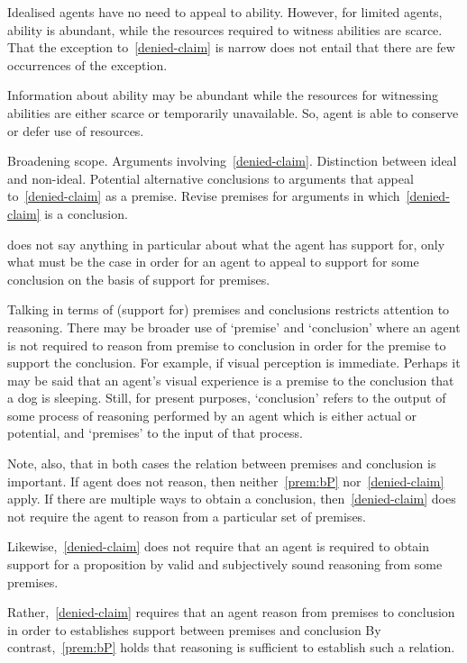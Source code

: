 \documentclass[10pt]{article}
\begin{document}
\begin{note}
  Idealised agents have no need to appeal to ability.
  However, for limited agents, ability is abundant, while the resources required to witness abilities are scarce.
  That the exception to~\ref{denied-claim} is narrow does not entail that there are few occurrences of the exception.

  Information about ability may be abundant while the resources for witnessing abilities are either scarce or temporarily unavailable.
  So, agent is able to conserve or defer use of resources.

  Broadening scope.
  Arguments involving~\ref{denied-claim}.
  Distinction between ideal and non-ideal.
  Potential alternative conclusions to arguments that appeal to~\ref{denied-claim} as a premise.
  Revise premises for arguments in which~\ref{denied-claim} is a conclusion.
\end{note}

\begin{note}[Scope of \mp{}]
  \mp{} does not say anything in particular about what the agent has support for, only what must be the case in order for an agent to appeal to support for some conclusion on the basis of support for premises.

  Talking in terms of (support for) premises and conclusions restricts attention to reasoning.
  There may be broader use of `premise' and `conclusion' where an agent is not required to reason from premise to conclusion in order for the premise to support the conclusion.
  For example, if visual perception is immediate.
  Perhaps it may be said that an agent's visual experience is a premise to the conclusion that a dog is sleeping.
  Still, for present purposes, `conclusion' refers to the output of some process of reasoning performed by an agent which is either actual or potential, and `premises' to the input of that process.

  Note, also, that in both cases the relation between premises and conclusion is important.
  If agent does not reason, then neither~\ref{prem:bP} nor~\ref{denied-claim} apply.
  If there are multiple ways to obtain a conclusion, then~\ref{denied-claim} does not require the agent to reason from a particular set of premises.

  Likewise,~\ref{denied-claim} does not require that an agent is required to obtain support for a proposition by valid and subjectively sound reasoning from some premises.

  Rather,~\ref{denied-claim} requires that an agent reason from premises to conclusion in order to establishes support between premises and conclusion
  By contrast,~\ref{prem:bP} holds that reasoning is sufficient to establish such a relation.
\end{note}
\end{document}
